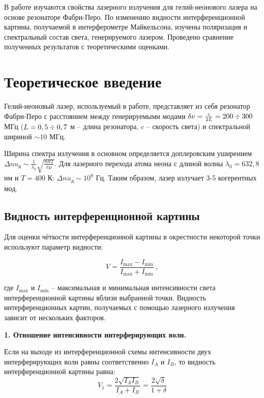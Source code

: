 \documentclass[a4paper,12pt]{article} %
\begin{document}

\begin{center}
    В работе изучаются свойства лазерного излучения для гелий-неонового лазера на основе резонаторе Фабри-Перо. По изменению видности интерференционной картины, получаемой в интерферометре Майкельсона, изучены поляризация и спектральный состав света, генерируемого лазером. Проведено сравнение полученных результатов с теоретическими оценками. 
\end{center}

\tableofcontents

\newpage

\section{Теоретическое введение}
Гелий-неоновый лазер, используемый в работе, представляет из себя резонатор Фабри-Перо с расстоянием между генерируемыми модами $\delta \nu = \frac{c}{2 L} = 200 \divisionsymbol 300$ МГц ($L = 0,5 \divisionsymbol 0,7$ м -- длина резонатора, $c$ -- скорость света) и спектральной шириной $\sim 10$ МГц. 

Ширина спектра излучения в основном определяется доплеровским уширением $\Delta nu_\text{д} \sim \frac{1}{\lambda_0} \sqrt{\frac{8 R T}{\pi \mu}}$. Для лазерного перехода атома неона с длиной волны $\lambda_0 = 632,8$ нм и $T = 400$ К: $\Delta nu_\text{д} \sim 10^9$ Гц. Таким образом, лазер излучает 3-5 когерентных мод. 
\subsection{Видность интерференционной картины}

Для оценки чёткости интерференционной картины в окрестности некоторой точки используют параметр видности:

\begin{equation}
    V =\frac{I_\text{max} - I_\text{min}}{I_\text{max} + I_\text{min}}~,
\end{equation}

где $I_\text{max}$ и $I_\text{min}$ -- максимальная и минимальная интенсивности света интерференционной картины вблизи выбранной точки. Видность интерференционных картин, получаемых с помощью лазерного излучения зависит от нескольких факторов.

\textbf{1. Отношение интенсивности интерферирующих волн.}

Если на выходе из интерференционной схемы интенсивности двух интерферирующих волн равны соответственно $I_A$ и $I_B$, то видность интерференционной картины равна:
\begin{equation}
    \label{eq:V1}
    \boxed{
    V_1 = \frac{2 \sqrt{I_A I_B}}{I_A + I_B} = \frac{2 \sqrt{\delta}}{1 + \delta}}
\end{equation}
\end{document}
